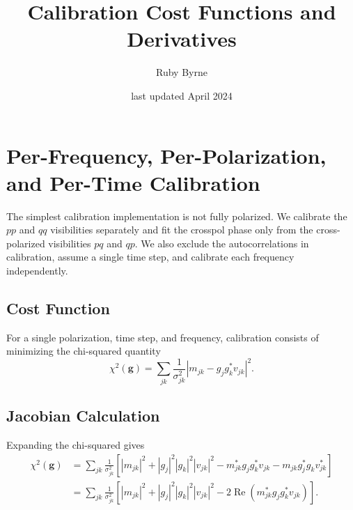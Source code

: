 \documentclass{article}
\title{Calibration Cost Functions and Derivatives}
\author{Ruby Byrne}
\date{last updated April 2024}
\newcommand\re{\operatorname{Re}}
\begin{document}
\maketitle

\section{Per-Frequency, Per-Polarization, and Per-Time Calibration}

The simplest calibration implementation is not fully polarized. We calibrate the $pp$ and $qq$ visibilities separately and fit the crosspol phase only from the cross-polarized visibilities $pq$ and $qp$. We also exclude the autocorrelations in calibration, assume a single time step, and calibrate each frequency independently.

\subsection{Cost Function}

For a single polarization, time step, and frequency, calibration consists of minimizing the chi-squared quantity
\begin{equation}
    \chi^2(\boldsymbol{g}) = \sum_{jk} \frac{1}{\sigma_{jk}^2} \left| m_{jk} - g_j g_k^* v_{jk} \right|^2.
\end{equation}

\subsection{Jacobian Calculation}
\label{s:simplest_jac}

Expanding the chi-squared gives
\begin{equation}
\begin{split}
    \chi^2(\boldsymbol{g}) &= \sum_{jk} \frac{1}{\sigma_{jk}^2} \left[ |m_{jk}|^2 + |g_j|^2 |g_k|^2 |v_{jk}|^2 - m_{jk}^* g_j g_k^* v_{jk} - m_{jk} g_j^* g_k v_{jk}^* \right] \\
    &= \sum_{jk} \frac{1}{\sigma_{jk}^2} \left[ |m_{jk}|^2 + |g_j|^2 |g_k|^2 |v_{jk}|^2 - 2 \re \left( m_{jk}^* g_j g_k^* v_{jk} \right) \right].
\end{split}
\end{equation}
\end{document}
